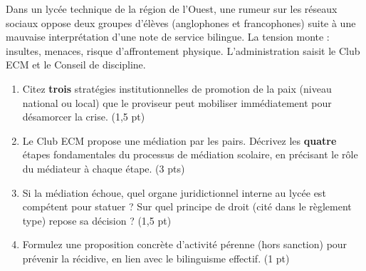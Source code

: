 \documentclass[11pt]{article}
\begin{document}
\begin{exercice}
Dans un lycée technique de la région de l'Ouest, une rumeur sur les réseaux sociaux oppose deux groupes d'élèves (anglophones et francophones) suite à une mauvaise interprétation d'une note de service bilingue. La tension monte : insultes, menaces, risque d'affrontement physique. L'administration saisit le Club ECM et le Conseil de discipline.

\begin{enumerate}
    \item Citez \textbf{trois} stratégies institutionnelles de promotion de la paix (niveau national ou local) que le proviseur peut mobiliser immédiatement pour désamorcer la crise. (1,5 pt)
    \item Le Club ECM propose une médiation par les pairs. Décrivez les \textbf{quatre} étapes fondamentales du processus de médiation scolaire, en précisant le rôle du médiateur à chaque étape. (3 pts)
    \item Si la médiation échoue, quel organe juridictionnel interne au lycée est compétent pour statuer ? Sur quel principe de droit (cité dans le règlement type) repose sa décision ? (1,5 pt)
    \item Formulez une proposition concrète d'activité pérenne (hors sanction) pour prévenir la récidive, en lien avec le bilinguisme effectif. (1 pt)
\end{enumerate}
\end{exercice}
\end{document}
